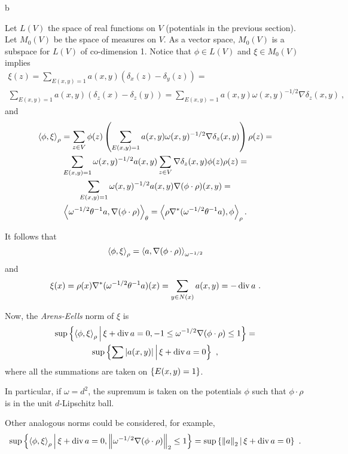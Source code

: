 b\documentclass[12pt,a4paper]{amsart}
\begin{document}
Let $L(V)$ the space of real functions on $V$ (potentials in the
previous section). Let $M_0(V)$ be the space of measures on $V$. As a
vector space, $M_0(V)$ is a subspace for $L(V)$ of co-dimension
1. Notice that $\phi \in L(V)$ and $\xi \in M_0(V)$ implies
\begin{multline*}
  \xi(z) =
\sum_{E(x,y)=1} a(x,y) (\delta_x(z) - \delta_y(z)) = \\
\sum_{E(x,y)=1} a(x,y) (\delta_z(x) - \delta_z(y)) = \sum_{E(x,y)=1}
a(x,y) \omega(x,y)^{-1/2} \nabla \delta_z (x,y) \ ,
\end{multline*}
and
\begin{multline*}
  \scalarat \rho \phi \xi = \sum_{z \in V} \phi(z)
  \left(\sum_{E(x,y)=1}
    a(x,y) \omega(x,y)^{-1/2} \nabla \delta_z (x,y)\right) \rho(z) = \\
  \sum_{E(x,y)=1} \omega(x,y) ^{-1/2} a(x,y) \sum_{z \in V} \nabla \delta_z
  (x,y) \phi(z) \rho(z) = \\ \sum_{E(x,y)=1} \omega(x,y) ^{-1/2} a(x,y)
  \nabla (\phi \cdot \rho) (x,y) = \\ \scalarat \theta
  {\omega^{-1/2}\theta^{-1} a} {\nabla (\phi\cdot\rho)} =
  \scalarat \rho {\rho \nabla^* (\omega^{-1/2} \theta^{-1} a)} {\phi} .
\end{multline*}

It follows that
\begin{equation*}
  \scalarat \rho \phi \xi = \scalarat {\omega^{-1/2}} {a} {\nabla (\phi\cdot\rho)}
\end{equation*}
and
\begin{equation*}
  \xi(x) = \rho(x) \nabla^* (\omega^{-1/2} \theta^{-1} a) (x) = \sum_{y
    \in N(x)}  a(x,y) = - \Div a \ . 
\end{equation*}

Now, the \emph{Arens-Eells} norm of $\xi$ is
\begin{multline*}
  \sup\setof{\scalarat \rho \phi \xi}{\xi + \Div a = 0,
  -1 \leq \omega^{-1/2} \nabla(\phi\cdot\rho) \leq 1} = \\ \sup\setof{\sum
  \avalof{a(x,y)}}{\xi + \Div a = 0} \ ,
\end{multline*}
where all the summations are taken on $\set{E(x,y)=1}$.

In particular, if $\omega = d^2$, the supremum is taken on the
potentials $\phi$ such that $\phi\cdot\rho$ is in the unit
$d$-Lipschitz ball.

Other analogous norms could be considered, for example,
\begin{equation*}
  \sup\setof{\scalarat \rho \phi \xi}{\xi + \Div a = 0,
  \normof{\omega^{-1/2} \nabla(\phi\cdot\rho)}_2 \leq 1} = 
\sup\setof{\normof a _2}{\xi + \Div a = 0} \ .
\end{equation*}
\end{document}
